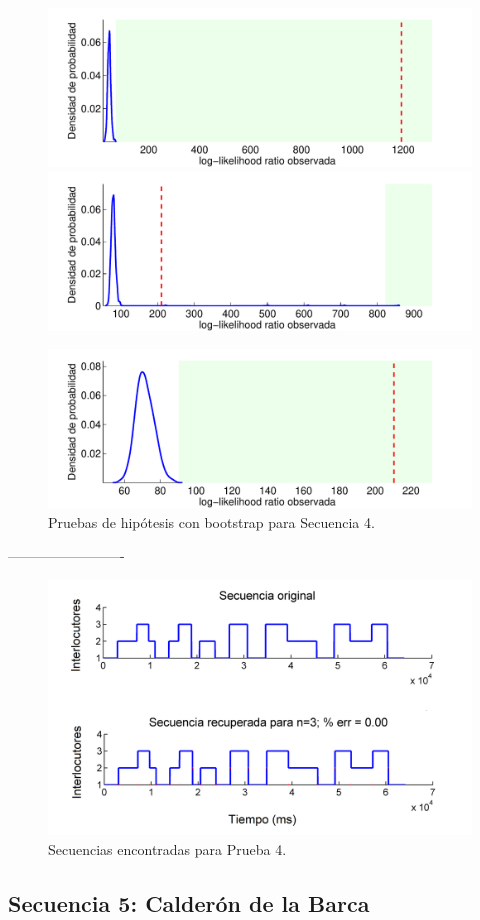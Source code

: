\begin{figure}[H]
  \centerline  
  {\includegraphics[width=0.6\linewidth]{gfx/chap6/noctboot1}
   \includegraphics[width=0.6\linewidth]{gfx/chap6/noctboot2} }
  \centerline  
  {\includegraphics[width=0.6\linewidth]{gfx/chap6/noctboot3}
    \hspace{0.6\linewidth}
  } \quad
  \caption{Pruebas de hipótesis con bootstrap para Secuencia 4.}
  \label{fig:prb1_boot}
\end{figure}

-------------------------

\begin{figure}[H]
  \centerline
  {\includegraphics[width=0.8\linewidth]{gfx/chap6/noct1_}} \quad
  \caption{Secuencias encontradas para Prueba 4.}
  \label{fig:prb1_seq}
\end{figure}

\newpage
\subsection{Secuencia 5: Calderón de la Barca}

